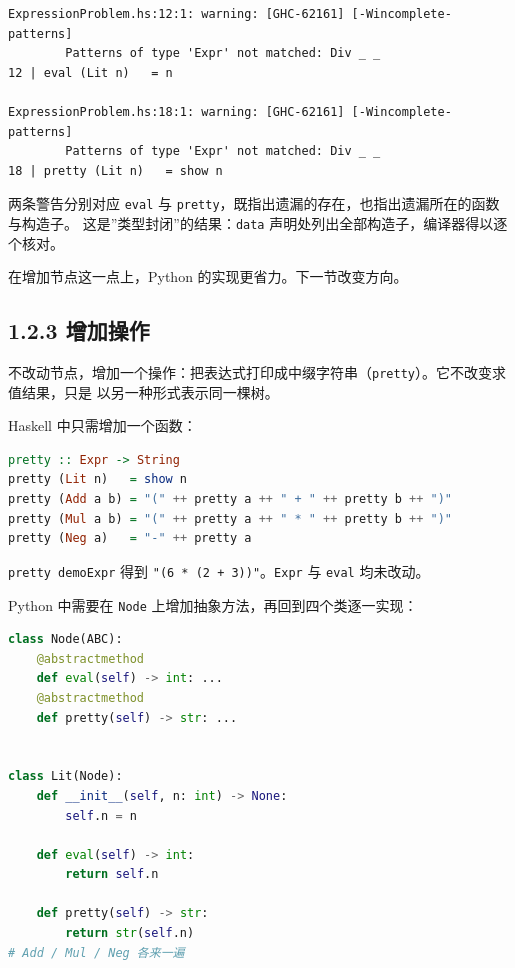 \begin{lstlisting}
ExpressionProblem.hs:12:1: warning: [GHC-62161] [-Wincomplete-patterns]
        Patterns of type 'Expr' not matched: Div _ _
12 | eval (Lit n)   = n

ExpressionProblem.hs:18:1: warning: [GHC-62161] [-Wincomplete-patterns]
        Patterns of type 'Expr' not matched: Div _ _
18 | pretty (Lit n)   = show n
\end{lstlisting}

两条警告分别对应 \passthrough{\lstinline!eval!} 与 \passthrough{\lstinline!pretty!}，既指出遗漏的存在，也指出遗漏所在的函数与构造子。
这是''类型封闭''的结果：\passthrough{\lstinline!data!} 声明处列出全部构造子，编译器得以逐个核对。

在增加节点这一点上，Python 的实现更省力。下一节改变方向。

\subsection{1.2.3 增加操作}\label{ux589eux52a0ux64cdux4f5c}

不改动节点，增加一个操作：把表达式打印成中缀字符串（\passthrough{\lstinline!pretty!}）。它不改变求值结果，只是
以另一种形式表示同一棵树。

Haskell 中只需增加一个函数：

\begin{lstlisting}[language=Haskell]
pretty :: Expr -> String
pretty (Lit n)   = show n
pretty (Add a b) = "(" ++ pretty a ++ " + " ++ pretty b ++ ")"
pretty (Mul a b) = "(" ++ pretty a ++ " * " ++ pretty b ++ ")"
pretty (Neg a)   = "-" ++ pretty a
\end{lstlisting}

\passthrough{\lstinline!pretty demoExpr!} 得到 \passthrough{\lstinline!"(6 * (2 + 3))"!}。\passthrough{\lstinline!Expr!} 与 \passthrough{\lstinline!eval!} 均未改动。

Python 中需要在 \passthrough{\lstinline!Node!} 上增加抽象方法，再回到四个类逐一实现：

\begin{lstlisting}[language=Python]
class Node(ABC):
    @abstractmethod
    def eval(self) -> int: ...
    @abstractmethod
    def pretty(self) -> str: ...


class Lit(Node):
    def __init__(self, n: int) -> None:
        self.n = n

    def eval(self) -> int:
        return self.n

    def pretty(self) -> str:
        return str(self.n)
# Add / Mul / Neg 各来一遍
\end{lstlisting}

